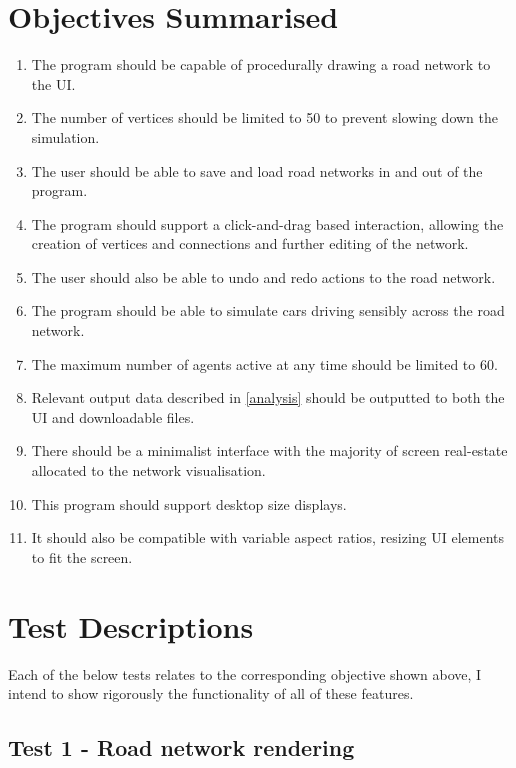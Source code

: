 \section{Objectives Summarised}

    \begin{enumerate}
        \item The program should be capable of procedurally drawing a road network to the UI.
        \item The number of vertices should be limited to 50 to prevent slowing down the simulation.
        \item The user should be able to save and load road networks in and out of the program.
        \item The program should support a click-and-drag based interaction, allowing the creation of vertices and connections and further editing of the network.
        \item The user should also be able to undo and redo actions to the road network.
        \item The program should be able to simulate cars driving sensibly across the road network.
        \item The maximum number of agents active at any time should be limited to 60.
        \item Relevant output data described in \autoref{analysis} should be outputted to both the UI and downloadable files.
        \item There should be a minimalist interface with the majority of screen real-estate allocated to the network visualisation.
        \item This program should support desktop size displays.
        \item It should also be compatible with variable aspect ratios, resizing UI elements to fit the screen.
    \end{enumerate}

\section{Test Descriptions}

    Each of the below tests relates to the corresponding objective shown above, I intend to show rigorously the functionality of all of these features.

    \subsection{Test 1 - Road network rendering}

